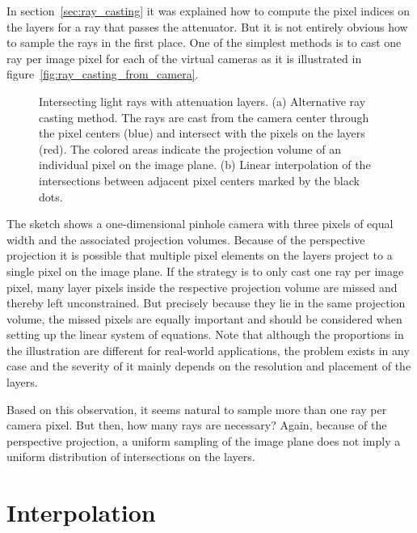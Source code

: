 In section~\ref{sec:ray_casting} it was explained how to compute the pixel indices on the layers for a ray that passes the attenuator.
But it is not entirely obvious how to sample the rays in the first place.
One of the simplest methods is to cast one ray per image pixel for each of the virtual cameras as it is illustrated in figure~\ref{fig:ray_casting_from_camera}. 
\begin{figure}[tb]
	\subcaptionbox{\label{fig:ray_casting_from_camera}}{}\hfill %
	\subcaptionbox{\label{fig:interpolation_on_layers}}{}
	\caption[Intersecting light rays with attenuation layers]
			{Intersecting light rays with attenuation layers.
			 (a) Alternative ray casting method. 
			 	 The rays are cast from the camera center through the pixel centers (blue) and intersect with the pixels on the layers (red).
			 	 The colored areas indicate the projection volume of an individual pixel on the image plane.
			 (b) Linear interpolation of the intersections between adjacent pixel centers marked by the black dots.}
\end{figure}
The sketch shows a one-dimensional pinhole camera with three pixels of equal width and the associated projection volumes.
Because of the perspective projection it is possible that multiple pixel elements on the layers project to a single pixel on the image plane.
If the strategy is to only cast one ray per image pixel, many layer pixels inside the respective projection volume are missed and thereby left unconstrained.
But precisely because they lie in the same projection volume, the missed pixels are equally important and should be considered when setting up the linear system of equations.
Note that although the proportions in the illustration are different for real-world applications, the problem exists in any case and the severity of it mainly depends on the resolution and placement of the layers. 

Based on this observation, it seems natural to sample more than one ray per camera pixel.
But then, how many rays are necessary? 
Again, because of the perspective projection, a uniform sampling of the image plane does not imply a uniform distribution of intersections on the layers.

\section{Interpolation}
\label{sec:interpolation}

